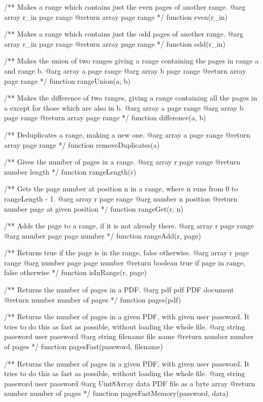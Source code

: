 /** Makes a range which contains just the even pages of another range.
@arg {array} r_in page range
@return {array} page range */
function even(r_in) {}

/** Makes a range which contains just the odd pages of another range.
@arg {array} r_in page range
@return {array} page range */
function odd(r_in) {}

/** Makes the union of two ranges giving a range containing the pages in range
a and range b.
@arg {array} a page range
@arg {array} b page range
@return {array} page range */
function rangeUnion(a, b) {}

/** Makes the difference of two ranges, giving a range containing all the
pages in a except for those which are also in b.
@arg {array} a page range
@arg {array} b page range
@return {array} page range */
function difference(a, b) {}

/** Deduplicates a range, making a new one.
@arg {array} a page range
@return {array} page range */
function removeDuplicates(a) {}

/** Gives the number of pages in a range.
@arg {array} r page range
@return {number} length */
function rangeLength(r) {}

/** Gets the page number at position n in a range, where n runs from 0 to
rangeLength - 1.
@arg {array} r page range
@arg {number} n position
@return {number} page at given position */
function rangeGet(r, n) {}

/** Adds the page to a range, if it is not already there.
@arg {array} r page range
@arg {number} page page number */
function rangeAdd(r, page) {}

/** Returns true if the page is in the range, false otherwise.
@arg {array} r page range
@arg {number} page page number
@return {boolean} true if page in range, false otherwise */
function isInRange(r, page) {}

/** Returns the number of pages in a PDF.
@arg {pdf} pdf PDF document
@return {number} number of pages */
function pages(pdf) {}

/** Returns the number of pages in a given PDF, with given user password. It
tries to do this as fast as possible, without loading the whole file.
@arg {string} password user password
@arg {string} filename file name
@return {number} number of pages */
function pagesFast(password, filename) {}

/** Returns the number of pages in a given PDF, with given user password. It
tries to do this as fast as possible, without loading the whole file.
@arg {string} password user password
@arg {Uint8Array} data PDF file as a byte array
@return {number} number of pages */
function pagesFastMemory(password, data) {}

